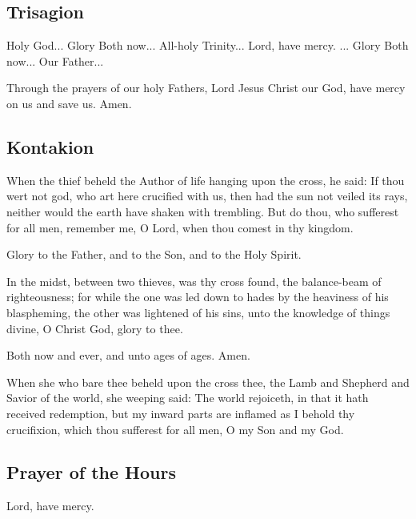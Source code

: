 \subsection{Trisagion}

Holy God... Glory  Both now... All-holy Trinity... Lord, have mercy. ... Glory  Both now... Our Father...

Through the prayers of our holy Fathers, Lord Jesus Christ our God, have mercy on us and save us. Amen.

\subsection{Kontakion}


When the thief beheld the Author of life hanging upon the cross, he said: If thou wert not god, who art here crucified with us, then had the sun not veiled its rays, neither would the earth have shaken with trembling. But do thou, who sufferest for all men, remember me, O Lord, when thou comest in thy kingdom.

Glory to the Father, and to the Son, and to the Holy Spirit.

In the midst, between two thieves, was thy cross found, the balance-beam of righteousness; for while the one was led down to hades by the heaviness of his blaspheming, the other was lightened of his sins, unto the knowledge of things divine, O Christ God, glory to thee.

Both now and ever, and unto ages of ages. Amen.

When she who bare thee beheld upon the cross thee, the Lamb and Shepherd and Savior of the world, she weeping said: The world rejoiceth, in that it hath received redemption, but my inward parts are inflamed as I behold thy crucifixion, which thou sufferest for all men, O my Son and my God.


\subsection{Prayer of the Hours}

Lord, have mercy. 

